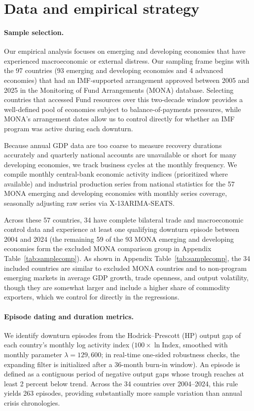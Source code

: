 \documentclass[12pt, a4paper]{article}
\begin{document}
\section{Data and empirical strategy}\label{sec:empirics}

\paragraph{Sample selection.} Our empirical analysis focuses on emerging and developing economies that have experienced macroeconomic or external distress. Our sampling frame begins with the 97 countries (93 emerging and developing economies and 4 advanced economies) that had an IMF-supported arrangement approved between 2005 and 2025 in the Monitoring of Fund Arrangements (MONA) database. Selecting countries that accessed Fund resources over this two-decade window provides a well-defined pool of economies subject to balance-of-payments pressures, while MONA's arrangement dates allow us to control directly for whether an IMF program was active during each downturn.

Because annual GDP data are too coarse to measure recovery durations accurately and quarterly national accounts are unavailable or short for many developing economies, we track business cycles at the monthly frequency. We compile monthly central-bank economic activity indices (prioritized where available) and industrial production series from national statistics for the 57 MONA emerging and developing economies with monthly series coverage, seasonally adjusting raw series via X-13ARIMA-SEATS.

Across these 57 countries, 34 have complete bilateral trade and macroeconomic control data and experience at least one qualifying downturn episode between 2004 and 2024 (the remaining 59 of the 93 MONA emerging and developing economies form the excluded MONA comparison group in Appendix Table~\ref{tab:samplecomp}). As shown in Appendix Table~\ref{tab:samplecomp}, the 34 included countries are similar to excluded MONA countries and to non-program emerging markets in average GDP growth, trade openness, and output volatility, though they are somewhat larger and include a higher share of commodity exporters, which we control for directly in the regressions.

\paragraph{Episode dating and duration metrics.} We identify downturn episodes from the Hodrick--Prescott (HP) output gap of each country's monthly log activity index ($100 \times \ln \text{Index}$, smoothed with monthly parameter $\lambda = 129{,}600$; in real-time one-sided robustness checks, the expanding filter is initialized after a 36-month burn-in window). An episode is defined as a contiguous period of negative output gaps whose trough reaches at least 2 percent below trend. Across the 34 countries over 2004--2024, this rule yields 263 episodes, providing substantially more sample variation than annual crisis chronologies.
\end{document}
